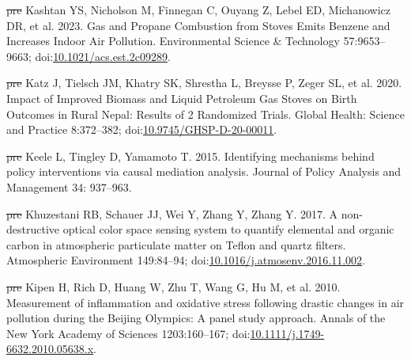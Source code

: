 \documentclass[
  letterpaper,
  DIV=11,
  numbers=noendperiod]{scrartcl}
\newlength{\cslhangindent}
\newenvironment{CSLReferences}[2] %
 {\begin{list}{}{%
  \setlength{\itemindent}{0pt} %
  \setlength{\leftmargin}{0pt} %
  \setlength{\parsep}{0pt} %
  \ifodd #1
   \setlength{\leftmargin}{\cslhangindent} %
   \setlength{\itemindent}{-1\cslhangindent} %
  \fi
  \setlength{\itemsep}{#2\baselineskip}}} %
 {\end{list}} %
\providecommand{\DIFdel}[1]{{\protect\color{red}\sout{#1}}}                      %
\providecommand{\DIFaddbegin}{} %
\providecommand{\DIFaddend}{} %
\providecommand{\DIFdelbegin}{} %
\providecommand{\DIFdelend}{} %
\newcommand{\DIFscaledelfig}{0.5}
\newlength{\DIFdelgraphicswidth} %
\newlength{\DIFdelgraphicsheight} %
\newcommand{\DIFaddincludegraphics}[2][]{{\color{blue}\fbox{\DIFOincludegraphics[#1]{#2}}}} %
\newcommand{\DIFdelincludegraphics}[2][]{%
\sbox{\DIFdelgraphicsbox}{\DIFOincludegraphics[#1]{#2}}%
\settoboxwidth{\DIFdelgraphicswidth}{\DIFdelgraphicsbox} %
\settoboxtotalheight{\DIFdelgraphicsheight}{\DIFdelgraphicsbox} %
\scalebox{\DIFscaledelfig}{%
\parbox[b]{\DIFdelgraphicswidth}{\usebox{\DIFdelgraphicsbox}\\[-\baselineskip] \rule{\DIFdelgraphicswidth}{0em}}\llap{\resizebox{\DIFdelgraphicswidth}{\DIFdelgraphicsheight}{%
\setlength{\unitlength}{\DIFdelgraphicswidth}%
\begin{picture}(1,1)%
\thicklines\linethickness{2pt} %
{\color[rgb]{1,0,0}\put(0,0){\framebox(1,1){}}}%
{\color[rgb]{1,0,0}\put(0,0){\line( 1,1){1}}}%
{\color[rgb]{1,0,0}\put(0,1){\line(1,-1){1}}}%
\end{picture}%
}\hspace*{3pt}}} %
} %
\DeclareRobustCommand{\DIFaddbegin}{\DIFOaddbegin \let\includegraphics\DIFaddincludegraphics} %
\DeclareRobustCommand{\DIFaddend}{\DIFOaddend \let\includegraphics\DIFOincludegraphics} %
\DeclareRobustCommand{\DIFdelbegin}{\DIFOdelbegin \let\includegraphics\DIFdelincludegraphics} %
\DeclareRobustCommand{\DIFdelend}{\DIFOaddend \let\includegraphics\DIFOincludegraphics} %
\begin{document}
\begin{CSLReferences}{1}{1}
\DIFdelbegin %
\DIFdel{pre}%
\DIFdelend \DIFaddbegin {}
\DIFaddend Kashtan YS, Nicholson M, Finnegan C, Ouyang Z, Lebel ED, Michanowicz DR,
et al. 2023. Gas and {Propane Combustion} from {Stoves Emits Benzene}
and {Increases Indoor Air Pollution}. Environmental Science \&
Technology 57:9653--9663;
doi:\href{https://doi.org/10.1021/acs.est.2c09289}{10.1021/acs.est.2c09289}.

\DIFdelbegin %
\DIFdel{pre}%
\DIFdelend \DIFaddbegin {}
\DIFaddend Katz J, Tielsch JM, Khatry SK, Shrestha L, Breysse P, Zeger SL, et al.
2020. Impact of {Improved Biomass} and {Liquid Petroleum Gas Stoves} on
{Birth Outcomes} in {Rural Nepal}: {Results} of 2 {Randomized Trials}.
Global Health: Science and Practice 8:372--382;
doi:\href{https://doi.org/10.9745/GHSP-D-20-00011}{10.9745/GHSP-D-20-00011}.

\DIFdelbegin %
\DIFdel{pre}%
\DIFdelend \DIFaddbegin {}
\DIFaddend Keele L, Tingley D, Yamamoto T. 2015. Identifying mechanisms behind
policy interventions via causal mediation analysis. Journal of Policy
Analysis and Management 34: 937--963.

\DIFdelbegin %
\DIFdel{pre}%
\DIFdelend \DIFaddbegin {}
\DIFaddend Khuzestani RB, Schauer JJ, Wei Y, Zhang Y, Zhang Y. 2017. A
non-destructive optical color space sensing system to quantify elemental
and organic carbon in atmospheric particulate matter on {Teflon} and
quartz filters. Atmospheric Environment 149:84--94;
doi:\href{https://doi.org/10.1016/j.atmosenv.2016.11.002}{10.1016/j.atmosenv.2016.11.002}.

\DIFdelbegin %
\DIFdel{pre}%
\DIFdelend \DIFaddbegin {}
\DIFaddend Kipen H, Rich D, Huang W, Zhu T, Wang G, Hu M, et al. 2010. Measurement
of inflammation and oxidative stress following drastic changes in air
pollution during the {Beijing Olympics}: A panel study approach. Annals
of the New York Academy of Sciences 1203:160--167;
doi:\href{https://doi.org/10.1111/j.1749-6632.2010.05638.x}{10.1111/j.1749-6632.2010.05638.x}.


\end{CSLReferences}
\end{document}
